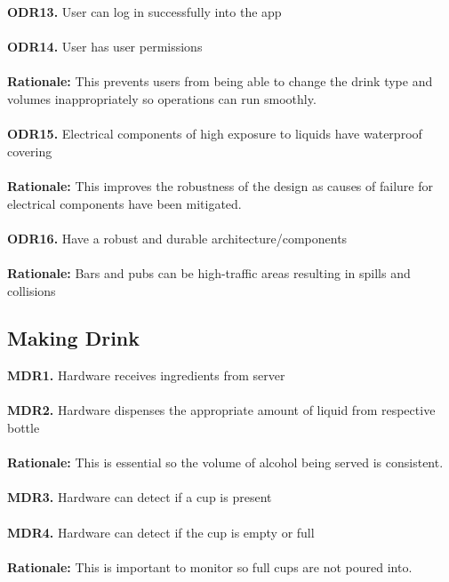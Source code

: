 \documentclass{article}
\begin{document}
    \textbf{ODR13.} User can log in successfully into the app \\\\
    
    \textbf{ODR14.} User has user permissions  \\\\
    \textbf{Rationale:} This prevents users from being able to change the drink type and volumes inappropriately so operations can run smoothly.\\\\
    
    \textbf{ODR15.} Electrical components of high exposure to liquids have waterproof covering\\\\
    \textbf{Rationale:} This improves the robustness of the design as causes of failure for electrical components have been mitigated.\\\\
    
    \textbf{ODR16.} Have a robust and durable architecture/components\\\\
    \indent\textbf{Rationale:} Bars and pubs can be high-traffic areas resulting in spills and collisions\\

\subsection{Making Drink}
    \noindent\textbf{MDR1.} Hardware receives ingredients from server \\\\
    
    \textbf{MDR2.} Hardware dispenses the appropriate amount of liquid from respective bottle \\\\
    \textbf{Rationale:} This is essential so the volume of alcohol being served is consistent.\\\\
    
    \textbf{MDR3.} Hardware can detect if a cup is present \\\\
    
    \textbf{MDR4.} Hardware can detect if the cup is empty or full \\\\
    \textbf{Rationale:} This is important to monitor so full cups are not poured into.\\
    
\end{document}
